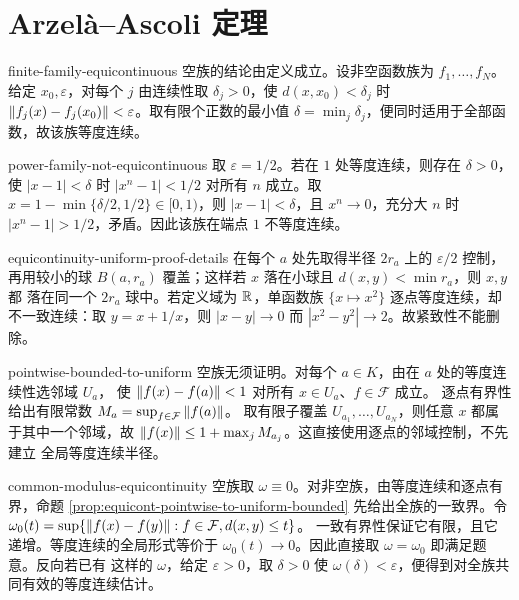 \chapter{Arzelà--Ascoli 定理}
\label{chap:arzela-ascoli-solutions}

\begin{solution}{finite-family-equicontinuous}
空族的结论由定义成立。设非空函数族为 $f_1,\ldots,f_N$。给定 $x_0,\varepsilon$，对每个 $j$ 由连续性取
$\delta_j>0$，使 $d(x,x_0)<\delta_j$ 时
$\left\lVert f_j(x)-f_j(x_0)\right\rVert<\varepsilon$。取有限个正数的最小值
$\delta=\min_j\delta_j$，便同时适用于全部函数，故该族等度连续。
\end{solution}

\begin{solution}{power-family-not-equicontinuous}
取 $\varepsilon=1/2$。若在 $1$ 处等度连续，则存在 $\delta>0$，使
$|x-1|<\delta$ 时 $|x^n-1|<1/2$ 对所有 $n$ 成立。取
$x=1-\min\{\delta/2,1/2\}\in[0,1)$，则 $|x-1|<\delta$，且
$x^n\to0$，充分大 $n$ 时
$|x^n-1|>1/2$，矛盾。因此该族在端点 $1$ 不等度连续。
\end{solution}

\begin{solution}{equicontinuity-uniform-proof-details}
在每个 $a$ 处先取得半径 $2r_a$ 上的 $\varepsilon/2$ 控制，再用较小的球
$B(a,r_a)$ 覆盖；这样若 $x$ 落在小球且 $d(x,y)<\min r_a$，则 $x,y$ 都
落在同一个 $2r_a$ 球中。若定义域为 $\mathbb{R}$，单函数族 $\{x\mapsto x^2\}$
逐点等度连续，却不一致连续：取 $y=x+1/x$，则 $|x-y|\to0$ 而
$|x^2-y^2|\to2$。故紧致性不能删除。
\end{solution}

\begin{solution}{pointwise-bounded-to-uniform}
空族无须证明。对每个 $a\in K$，由在 $a$ 处的等度连续性选邻域 $U_a$，
使 $\left\lVert f(x)-f(a)\right\rVert<1$ 对所有 $x\in U_a$、$f\in\mathcal F$ 成立。
逐点有界性给出有限常数 $M_a=\sup_{f\in\mathcal F}\left\lVert f(a)\right\rVert$。
取有限子覆盖 $U_{a_1},\ldots,U_{a_N}$，则任意 $x$ 都属于其中一个邻域，故
$\left\lVert f(x)\right\rVert\le1+\max_j M_{a_j}$。这直接使用逐点的邻域控制，不先建立
全局等度连续半径。
\end{solution}

\begin{solution}{common-modulus-equicontinuity}
空族取 $\omega\equiv0$。对非空族，由等度连续和逐点有界，命题
\ref{prop:equicont-pointwise-to-uniform-bounded} 先给出全族的一致界。令
$\omega_0(t)=\sup\{\left\lVert f(x)-f(y)\right\rVert:f\in\mathcal F,d(x,y)\le t\}$。
一致有界性保证它有限，且它递增。等度连续的全局形式等价于
$\omega_0(t)\to0$。因此直接取 $\omega=\omega_0$ 即满足题意。反向若已有
这样的 $\omega$，给定 $\varepsilon>0$，取 $\delta>0$ 使
$\omega(\delta)<\varepsilon$，便得到对全族共同有效的等度连续估计。
\end{solution}

